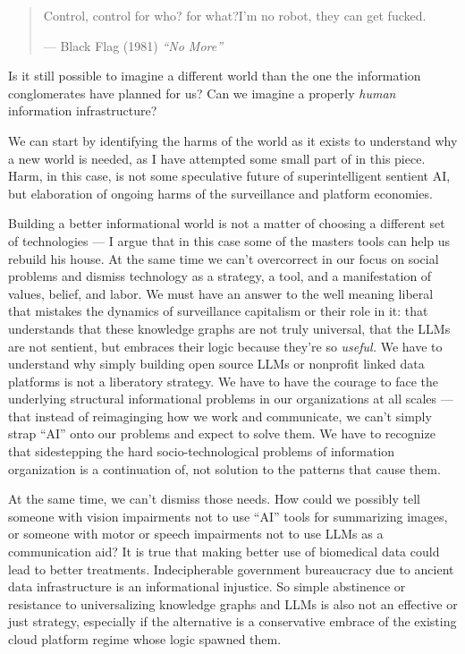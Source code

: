 \begin{quote}
Control, control for who? for what?I'm no robot, they can get fucked.

--- Black Flag (1981) \emph{``No More''}
\end{quote}

Is it still possible to imagine a different world than the one the
information conglomerates have planned for us? Can we imagine a properly
\emph{human} information infrastructure?

We can start by identifying the harms of the world as it exists to
understand why a new world is needed, as I have attempted some small
part of in this piece. Harm, in this case, is not some speculative
future of superintelligent sentient AI, but elaboration of ongoing harms
of the surveillance and platform economies.

Building a better informational world is not a matter of choosing a
different set of technologies --- I argue that in this case some of the
masters tools can help us rebuild his house. At the same time we can't
overcorrect in our focus on social problems and dismiss technology as a
strategy, a tool, and a manifestation of values, belief, and labor. We
must have an answer to the well meaning liberal that mistakes the
dynamics of surveillance capitalism or their role in it: that
understands that these knowledge graphs are not truly universal, that
the LLMs are not sentient, but embraces their logic because they're so
\emph{useful.} We have to understand why simply building open source
LLMs or nonprofit linked data platforms is not a liberatory strategy. We
have to have the courage to face the underlying structural informational
problems in our organizations at all scales --- that instead of
reimaginging how we work and communicate, we can't simply strap ``AI''
onto our problems and expect to solve them. We have to recognize that
sidestepping the hard socio-technological problems of information
organization is a continuation of, not solution to the patterns that
cause them.

At the same time, we can't dismiss those needs. How could we possibly
tell someone with vision impairments not to use ``AI'' tools for
summarizing images, or someone with motor or speech impairments not to
use LLMs as a communication aid? It is true that making better use of
biomedical data could lead to better treatments. Indecipherable
government bureaucracy due to ancient data infrastructure is an
informational injustice. So simple abstinence or resistance to
universalizing knowledge graphs and LLMs is also not an effective or
just strategy, especially if the alternative is a conservative embrace
of the existing cloud platform regime whose logic spawned them.

